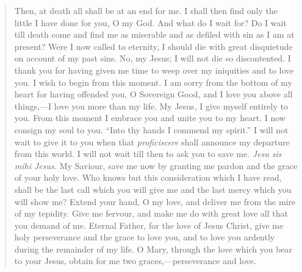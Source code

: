 \begin{quote}
Then, at death all shall be at an end for me. I shall then find only the little I have done for you, O my God. And what do I wait for? Do I wait till death come and find me as miserable and as defiled with sin as I am at present? Were I now called to eternity, I should die with great disquietude on account of my past sins. No, my Jesus; I will not die so discontented. I thank you for having given me time to weep over my iniquities and to love you. I wish to begin from this moment. I am sorry from the bottom of my heart for having offended you, O Sovereign Good, and I love you above all things,---I love you more than my life. My Jesus, I give myself entirely to you. From this moment I embrace you and unite you to my heart. I now consign my soul to you. ``Into thy hands I commend my spirit.'' I will not wait to give it to you when that \textit{proficiscere} shall announce my departure from this world. I will not wait till then to ask you to save me. \textit{Jesu sis mihi Jesus.} My Saviour, save me now by granting me pardon and the grace of your holy love. Who knows but this consideration which I have read, shall be the last call which you will give me and the last mercy which you will show me? Extend your hand, O my love, and deliver me from the mire of my tepidity. Give me fervour, and make me do with great love all that you demand of me. Eternal Father, for the love of Jesus Christ, give me holy perseverance and the grace to love you, and to love you ardently during the remainder of my life. O Mary, through the love which you bear to your Jesus, obtain for me two graces,---perseverance and love.
\end{quote}

